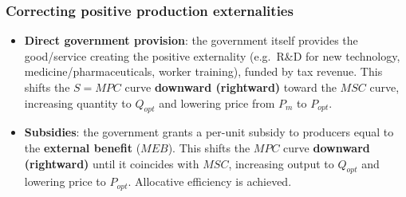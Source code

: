 \documentclass[a4paper,12pt]{article}
\begin{document}
\subsubsection*{Correcting positive production externalities}
\begin{itemize}
  \item \textbf{Direct government provision}: the government itself provides the good/service creating the positive externality (e.g.\ R\&D for new technology, medicine/pharmaceuticals, worker training), funded by tax revenue. This shifts the $S = MPC$ curve \textbf{downward (rightward)} toward the $MSC$ curve, increasing quantity to $Q_{opt}$ and lowering price from $P_m$ to $P_{opt}$.
  \item \textbf{Subsidies}: the government grants a per-unit subsidy to producers equal to the \textbf{external benefit} ($MEB$). This shifts the $MPC$ curve \textbf{downward (rightward)} until it coincides with $MSC$, increasing output to $Q_{opt}$ and lowering price to $P_{opt}$. Allocative efficiency is achieved.
\end{itemize}
\begin{center}
\end{center}
\end{document}
